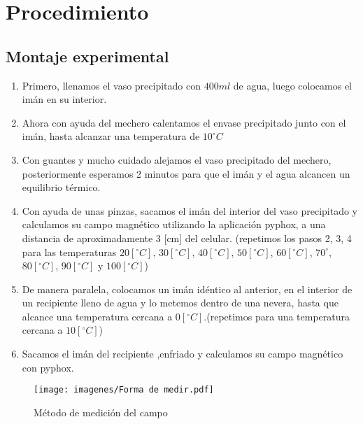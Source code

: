 \section{Procedimiento}
\subsection{Montaje experimental}







\begin{enumerate}
\subsection{Pasos a seguir}
    \item Primero, llenamos el vaso precipitado con $400 ml$ de agua, luego colocamos el imán en su interior.
    \item Ahora con ayuda del mechero calentamos el envase precipitado junto con el  imán, hasta alcanzar una temperatura de $10^\circ C$
    \item Con guantes y mucho cuidado alejamos el vaso precipitado del mechero, posteriormente esperamos 2 minutos para que el imán y el agua alcancen un equilibrio térmico. 
    
    \item Con ayuda de unas pinzas, sacamos el imán del interior del vaso precipitado y calculamos su campo magnético utilizando la aplicación pyphox, a una distancia de aproximadamente 3 [cm] del celular. (repetimos los pasos 2, 3, 4 para las temperaturas $20 [^\circ C]$, $30 [^\circ C]$, $40 [^\circ C]$, $50 [^\circ C]$, $60 [^\circ C]$, $70^\circ$, $80 [^\circ C]$, $90 [^\circ C]$ y $100 [^\circ C]$)
    \item De manera paralela, colocamos un imán idéntico al anterior, en el interior de un recipiente lleno de agua y lo metemos dentro de una nevera, hasta que alcance una temperatura cercana a $0 [^\circ C]$.(repetimos para una temperatura cercana a $10 [^\circ C]$)
    \item Sacamos el imán  del recipiente ,enfriado y calculamos su campo magnético con pyphox.


\end{enumerate}

\begin{figure}[h!]
    \centering
    \texttt{[image: imagenes/Forma de medir.pdf]}
    \caption{Método de medición del campo}
    \label{Metodo-de-medicion}
\end{figure}


